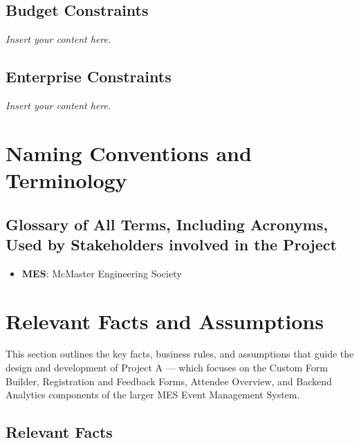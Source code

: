 \documentclass[12pt]{article}
\newcommand{\lips}{\textit{Insert your content here.}}
\begin{document}
\subsection{Budget Constraints}
\lips
\subsection{Enterprise Constraints}
\lips

\section{Naming Conventions and Terminology}
\subsection{Glossary of All Terms, Including Acronyms, Used by Stakeholders
involved in the Project}
\begin{itemize}
  \item \textbf{MES}: McMaster Engineering Society
\end{itemize}

\section{Relevant Facts and Assumptions}

This section outlines the key facts, business rules, and assumptions that guide the design and development of Project A — which focuses on the Custom Form Builder, Registration and Feedback Forms, Attendee Overview, and Backend Analytics components of the larger MES Event Management System.

\subsection{Relevant Facts}
\end{document}
